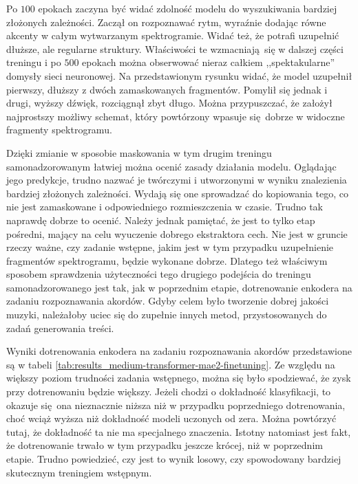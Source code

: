 Po $100$ epokach zaczyna być widać zdolność modelu do wyszukiwania bardziej złożonych zależności. Zaczął on rozpoznawać rytm, wyraźnie dodając równe akcenty w całym wytwarzanym spektrogramie. Widać też, że potrafi uzupełnić dłuższe, ale regularne struktury. Właściwości te wzmacniają się w dalszej części treningu i po $500$ epokach można obserwować nieraz całkiem ,,spektakularne'' domysły sieci neuronowej. Na przedstawionym rysunku widać, że model uzupełnił pierwszy, dłuższy z dwóch zamaskowanych fragmentów. Pomylił się jednak i drugi, wyższy dźwięk, rozciągnął zbyt długo. Można przypuszczać, że założył najprostszy możliwy schemat, który powtórzony wpasuje się dobrze w widoczne fragmenty spektrogramu. 

Dzięki zmianie w sposobie maskowania w tym drugim treningu samonadzorowanym łatwiej można ocenić zasady działania modelu. Oglądając jego predykcje, trudno nazwać je twórczymi i utworzonymi w wyniku znalezienia bardziej złożonych zależności. Wydają się one sprowadzać do kopiowania tego, co nie jest zamaskowane i odpowiedniego rozmieszczenia w czasie. Trudno tak naprawdę dobrze to ocenić. Należy jednak pamiętać, że jest to tylko etap pośredni, mający na celu wyuczenie dobrego ekstraktora cech. Nie jest w gruncie rzeczy ważne, czy zadanie wstępne, jakim jest w tym przypadku uzupełnienie fragmentów spektrogramu, będzie wykonane dobrze. Dlatego też właściwym sposobem sprawdzenia użyteczności tego drugiego podejścia do treningu samonadzorowanego jest tak, jak w poprzednim etapie, dotrenowanie enkodera na zadaniu rozpoznawania akordów. Gdyby celem było tworzenie dobrej jakości muzyki, należałoby uciec się do zupełnie innych metod, przystosowanych do zadań generowania treści.

Wyniki dotrenowania enkodera na zadaniu rozpoznawania akordów przedstawione są w tabeli \ref{tab:results_medium-transformer-mae2-finetuning}. Ze względu na większy poziom trudności zadania wstępnego, można się było spodziewać, że zysk przy dotrenowaniu będzie większy. Jeżeli chodzi o dokładność klasyfikacji, to okazuje się ona nieznacznie niższa niż w przypadku poprzedniego dotrenowania, choć wciąż wyższa niż dokładność modeli uczonych od zera. Można powtórzyć tutaj, że dokładność ta nie ma specjalnego znaczenia. Istotny natomiast jest fakt, że dotrenowanie trwało w tym przypadku jeszcze krócej, niż w poprzednim etapie. Trudno powiedzieć, czy jest to wynik losowy, czy spowodowany bardziej skutecznym treningiem wstępnym.

